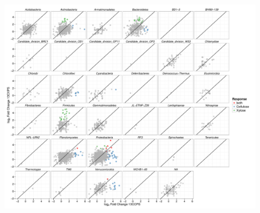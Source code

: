 \begin{figure}[H]
	\begin{center}
    \centerline{\includegraphics[width=\textwidth]{figures/generalist_specialist/generalist_specialist.pdf}}
    \caption{\protect}\label{fig:genspec}
    \end{center} 
\end{figure}

